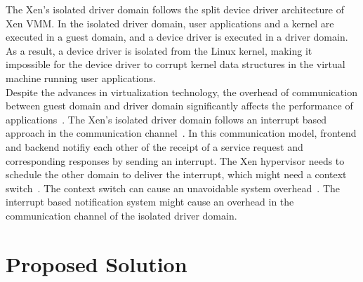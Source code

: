 The Xen's isolated driver domain follows the split device driver architecture of Xen VMM. In the isolated driver domain, user applications and a kernel are executed in a guest domain, and a device driver is executed in a driver domain. As a result, a device driver is isolated from the Linux kernel, making it impossible for the device driver to corrupt kernel data structures in the virtual machine running user applications. 
\\[3mm]
Despite the advances in virtualization technology, the overhead of communication between guest domain and driver domain significantly affects the performance of applications~\cite{barham2003xen, Sugerman:2001:VID:647055.715774, Menon:2006:ONV:1267359.1267361}. The Xen's isolated driver domain follows an interrupt based approach in the communication channel~\cite{barham2003xen}. In this communication model, frontend and backend notifiy each other of the receipt of a service request and corresponding responses by sending an interrupt. The Xen hypervisor needs to schedule the other domain to deliver the interrupt, which might need a context switch~\cite{barham2003xen}. The context switch can cause an unavoidable system overhead~\cite{Li:2007:QCC:1281700.1281702, Mogul:1991:ECS:106973.106982}. The interrupt based notification system might cause an overhead in the communication channel of the isolated driver domain. 

\section {Proposed Solution}

